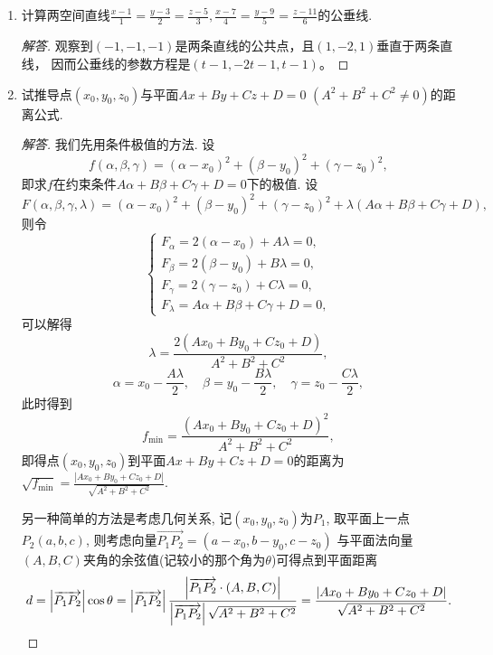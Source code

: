 \begin{2a}
\begin{enumerate}
\begin{proof}[解答]
\[\begin{split}
\end{split}\]
分别记\(A_i=|\boldsymbol{d}_i|^2,B=\inp{\boldsymbol{d}_1,\boldsymbol{d}_2},
C_i=\inp{\boldsymbol{a}_1-\boldsymbol{a}_2,\boldsymbol{d}_i}\) \((i=1,2)\), 这样就有
\[D(t_1,t_2)=A_1t_1^2-2Bt_1t_2+A_2t_2^2+2C_1t_1-2C_2t_2+\left|\boldsymbol{a}_1-\boldsymbol{a}_2\right|^2,\]
分别对\(t_1,t_2\)求偏导有
\[\frac{\partial D}{\partial t_1}=2A_1t_1-2Bt_2+2C_1,\quad
\frac{\partial D}{\partial t_2}=2A_2t_2-2Bt_1-2C_2,\]
令\(\frac{\partial D}{\partial t_1}=\frac{\partial D}{\partial t_2}=0\), 并且注意到
\[A_1A_2-B^2=(l_1m_2-l_2m_1)^2+(m_1n_2-m_2n_1)^2+(n_1l_2-n_2l_1)^2>0,\]
由Cramer法则可得\[t'_1=\frac{BC_2-A_2C_1}{A_1A_2-B^2},\quad t'_2=\frac{A_1C_2-BC_1}{A_1A_2-B^2},\]
代入\(D(t_1,t_2)\)开方即得结果.
\end{proof}

\item 计算两空间直线\(\frac{x-1}{1}=\frac{y-3}{2}=\frac{z-5}{3},
\frac{x-7}{4}=\frac{y-9}{5}=\frac{z-11}{6}\)的公垂线.
\begin{proof}[解答]
观察到$(-1,-1,-1)$是两条直线的公共点，且$(1,-2,1)$垂直于两条直线，
因而公垂线的参数方程是$(t-1,-2t-1,t-1)$。
\end{proof}

\item 试推导点\((x_0,y_0,z_0)\)与平面\(Ax+By+Cz+D=0\) \((A^2+B^2+C^2\ne 0)\)的距离公式.
\begin{proof}[解答]
我们先用条件极值的方法. 设
\[f(\alpha,\beta,\gamma)=(\alpha-x_0)^2+(\beta-y_0)^2+(\gamma-z_0)^2,\]
即求\(f\)在约束条件\(A\alpha+B\beta+C\gamma+D=0\)下的极值. 设
\[F(\alpha,\beta,\gamma,\lambda)=(\alpha-x_0)^2+(\beta-y_0)^2+(\gamma-z_0)^2
+\lambda\left(A\alpha+B\beta+C\gamma+D\right),\]则令\[\begin{cases}
F_{\alpha}=2\left(\alpha-x_0\right)+A\lambda=0,\\
F_{\beta}=2\left(\beta-y_0\right)+B\lambda=0,\\
F_{\gamma}=2\left(\gamma-z_0\right)+C\lambda=0,\\
F_{\lambda}=A\alpha+B\beta+C\gamma+D=0,
\end{cases}\]
可以解得\[\lambda=\frac{2(Ax_0+By_0+Cz_0+D)}{A^2+B^2+C^2},\]
\[\alpha=x_0-\frac{A\lambda}{2},\quad\beta=y_0-\frac{B\lambda}{2},
\quad\gamma=z_0-\frac{C\lambda}{2},\]此时得到
\[f_{\min}=\frac{(Ax_0+By_0+Cz_0+D)^2}{A^2+B^2+C^2},\]
即得点\((x_0,y_0,z_0)\)到平面\(Ax+By+Cz+D=0\)的距离为
\(\sqrt{f_{\min}}=\frac{\left|Ax_0+By_0+Cz_0+D\right|}{\sqrt{A^2+B^2+C^2}}\).

另一种简单的方法是考虑几何关系, 
记\((x_0,y_0,z_0)\)为\(P_1\), 取平面上一点\(P_2(a,b,c)\), 
则考虑向量\(\overrightarrow{P_1P_2}=\left(a-x_0,b-y_0,c-z_0\right)\)
与平面法向量\((A,B,C)\)夹角的余弦值(记较小的那个角为\(\theta\))可得点到平面距离
\[d=\left|\overrightarrow{P_1P_2}\right|\cos\theta
=\left|\overrightarrow{P_1P_2}\right|\frac{\left|\overrightarrow{P_1P_2}\cdot\left(A,B,C\right)\right|}{\left|\overrightarrow{P_1P_2}\right|\sqrt{A^2+B^2+C^2}}
=\frac{\left|Ax_0+By_0+Cz_0+D\right|}{\sqrt{A^2+B^2+C^2}}.\qedhere\]
\end{proof}


\end{enumerate}
\end{2a}
